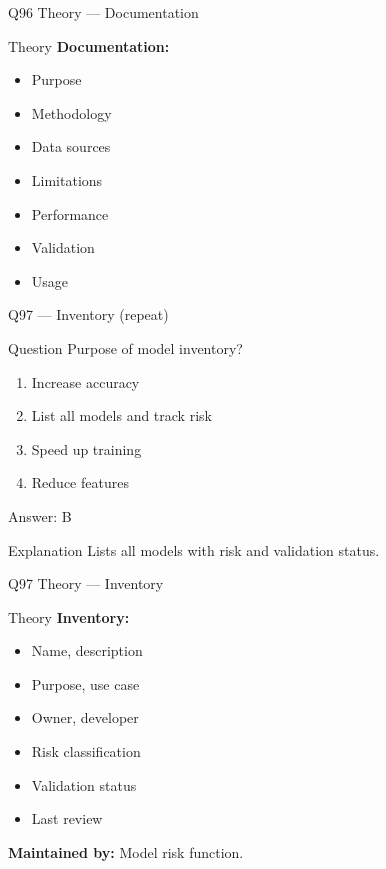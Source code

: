 \documentclass[aspectratio=169,8pt]{beamer}
\begin{document}
	\begin{frame}{Q96 Theory --- Documentation}
		\begin{block}{Theory}
			\textbf{Documentation:}
			\begin{itemize}
				\item Purpose
				\item Methodology
				\item Data sources
				\item Limitations
				\item Performance
				\item Validation
				\item Usage
			\end{itemize}
		\end{block}
	\end{frame}
	
	\begin{frame}{Q97 --- Inventory (repeat)}
		\begin{block}{Question}
			Purpose of model inventory?
		\end{block}
		\begin{enumerate}[label=\Alph*.]
			\item Increase accuracy
			\item List all models and track risk
			\item Speed up training
			\item Reduce features
		\end{enumerate}
		\begin{exampleblock}{Answer: B}
		\end{exampleblock}
		\begin{block}{Explanation}
			Lists all models with risk and validation status.
		\end{block}
	\end{frame}
	
	\begin{frame}{Q97 Theory --- Inventory}
		\begin{block}{Theory}
			\textbf{Inventory:}
			\begin{itemize}
				\item Name, description
				\item Purpose, use case
				\item Owner, developer
				\item Risk classification
				\item Validation status
				\item Last review
			\end{itemize}
			\textbf{Maintained by:} Model risk function.
		\end{block}
	\end{frame}
	
\end{document}

